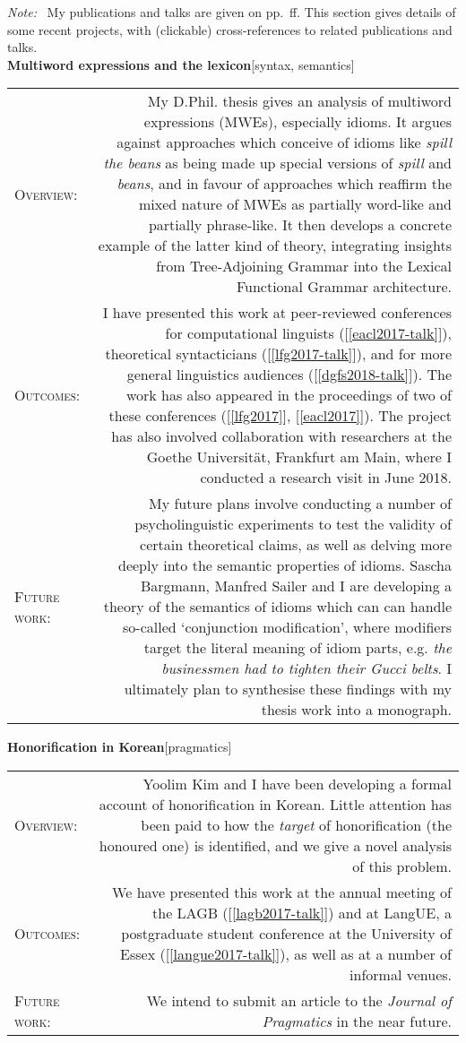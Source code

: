 \documentclass[11pt,a4paper,twoside]{article}
\makeatletter
\newlength{\rulelength}%
\newcommand{\REx}[2]{%
\vspace*{0.1\baselineskip}%
{\large\textbf{#1}\hfill\textnormal{[#2]}}%
\vspace*{0.5\baselineskip}%
}
\newenvironment{cvsection}{%
  \setlength{\extrarowheight}{0.70ex}
  \begin{longtable}[l]{@{} L R @{}}
}{%
  \end{longtable}
}
\newcommand{\sref}[1]{[\ref{#1}]}
\newcommand{\note}{\emph{Note: }}
\newcommand{\subhead}[1]{%
\textsc{#1}:%
}
\makeatother
\begin{document}
\note\ My publications and talks are given on pp.~\pageref{scholarship}ff. This section gives details of some recent projects, with (clickable) cross-references to related publications and talks.\\

\REx{Multiword expressions and the lexicon}{syntax, semantics}
\begin{cvsection}
  \subhead{Overview} &%
  My D.Phil. thesis gives an analysis of multiword expressions (MWEs), especially idioms. It argues against approaches which conceive of idioms like \emph{spill the beans} as being made up special versions of \emph{spill} and \emph{beans}, and in favour of approaches which reaffirm the mixed nature of MWEs as partially word-like and partially phrase-like. It then develops a concrete example of the latter kind of theory, integrating insights from Tree-Adjoining Grammar into the Lexical Functional Grammar architecture.%
\\
  \subhead{Outcomes} &%
  I have presented this work at peer-reviewed conferences for computational linguists (\sref{eacl2017-talk}), theoretical syntacticians (\sref{lfg2017-talk}), and for more general linguistics audiences (\sref{dgfs2018-talk}). The work has also appeared in the proceedings of two of these conferences (\sref{lfg2017}, \sref{eacl2017}).
  The project has also involved collaboration with researchers at the Goethe Universit\"{a}t, Frankfurt am Main, where I conducted a research visit in June 2018.
\\
  \subhead{Future work} &%
  My future plans involve conducting a number of psycholinguistic experiments to test the validity of certain theoretical claims, as well as delving more deeply into the semantic properties of idioms. Sascha Bargmann, Manfred Sailer and I are developing a theory of the semantics of idioms which can can handle so-called `conjunction modification', where modifiers target the literal meaning of idiom parts, e.g. \textit{the businessmen had to tighten their Gucci belts}. I ultimately plan to synthesise these findings with my thesis work into a monograph.
\end{cvsection}

\REx{Honorification in Korean}{pragmatics}
\begin{cvsection}
  \subhead{Overview} &%
  Yoolim Kim and I have been developing a formal account of honorification in Korean. Little attention has been paid to how the \emph{target} of honorification (the honoured one) is identified, and we give a novel analysis of this problem.%
\\
  \subhead{Outcomes} &%
  We have presented this work at the annual meeting of the LAGB (\sref{lagb2017-talk}) and at LangUE, a postgraduate student conference at the University of Essex (\sref{langue2017-talk}), as well as at a number of informal venues.%
\\
  \subhead{Future work} &%
  We intend to submit an article to the \textit{Journal of Pragmatics} in the near future.
\end{cvsection}
\end{document}
